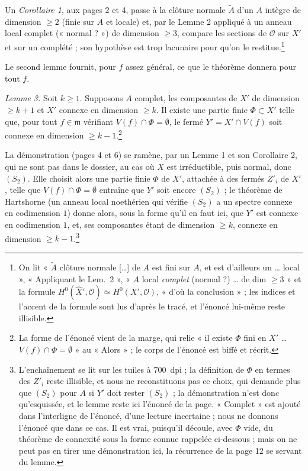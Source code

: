 \documentclass[11pt,a4paper]{article}
\begin{document}
Un \emph{Corollaire 1}, aux pages 2 et 4, passe à la clôture normale
$\tilde{A}$ d'un $A$ intègre de dimension $\geq 2$ (finie sur $A$ et
locale) et, par le Lemme 2 appliqué à un anneau local complet (« normal ? »)
de dimension $\geq 3$, compare les sections de $\mathcal{O}$ sur $X'$ et sur
un complété ; son hypothèse est trop lacunaire pour qu'on le
restitue.\footnote{On lit « $\tilde{A}$ clôture normale […] de $A$ est fini sur
$A$, et est d'ailleurs un … local », « Appliquant le Lem.~2 », « $A$ local
\emph{complet} (normal ?) … de dim $\geq 3$ » et la formule
$H^0(\widehat{X}', \mathcal{O}) \simeq H^0(X', \mathcal{O})$, « d'où la
conclusion » ; les indices et l'accent de la formule sont lus d'après le
tracé, et l'énoncé lui-même reste illisible.}

Le second lemme fournit, pour $f$ assez général, ce que le théorème donnera
pour tout $f$.

\emph{Lemme 3.} Soit $k \geq 1$. Supposons $A$ complet, les composantes de $X'$ de
dimension $\geq k+1$ et $X'$ connexe en dimension $\geq k$. Il existe une
partie finie $\Phi \subset X'$ telle que, pour tout $f \in \mathfrak{m}$
vérifiant $V(f) \cap \Phi = \emptyset$, le fermé $Y' = X' \cap V(f)$ soit
connexe en dimension $\geq k-1$.\footnote{La forme de l'énoncé vient de la
marge, qui relie « il existe $\Phi$ fini en $X'$ … $V(f) \cap \Phi =
\emptyset$ » au « Alors » ; le corps de l'énoncé est biffé et récrit.}

La démonstration (pages 4 et 6) se ramène, par un Lemme 1 et son Corollaire 2,
qui ne sont pas dans le dossier, au cas où $X$ est irréductible, puis normal,
donc $(S_2)$. Elle choisit alors une partie finie $\Phi$ de $X'$, attachée à
des fermés $Z'_i$ de $X'$, telle que $V(f) \cap \Phi = \emptyset$ entraîne
que $Y'$ soit encore $(S_2)$ ; le théorème de Hartshorne (un anneau local
noethérien qui vérifie $(S_2)$ a un spectre connexe en codimension $1$)
donne alors, sous la forme qu'il en faut ici, que $Y'$ est connexe en
codimension $1$, et, ses composantes étant de
dimension $\geq k$, connexe en dimension $\geq k-1$.\footnote{L'enchaînement
se lit sur les tuiles à 700~dpi ; la définition de $\Phi$ en termes des
$Z'_i$ reste illisible, et nous ne reconstituons pas ce choix, qui demande plus
que $(S_2)$ pour $A$ si $Y'$ doit rester $(S_2)$ ; la démonstration n'est donc
qu'esquissée, et le lemme reste ici l'énoncé de la page. « Complet » est ajouté
dans l'interligne de l'énoncé, d'une lecture incertaine ; nous ne donnons
l'énoncé que dans ce cas. Il est vrai, puisqu'il découle, avec $\Phi$ vide, du
théorème de connexité sous la forme connue rappelée ci-dessous ; mais on ne
peut pas en tirer une démonstration ici, la récurrence de la page 12 se servant
du lemme.}
\end{document}
